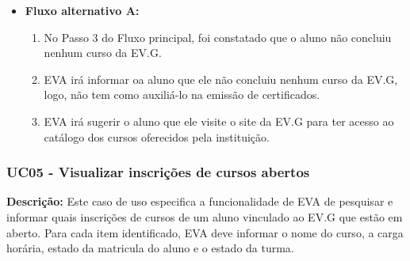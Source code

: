 \begin{itemize}
\begin{enumerate}
        \end{enumerate}
    \item \textbf{Fluxo alternativo A:}
        \begin{enumerate}
            \item No Passo 3 do Fluxo principal, foi constatado que o aluno não concluiu nenhum curso da EV.G.
            \item EVA irá informar oa aluno que ele não concluiu nenhum curso da EV.G, logo, não tem como auxiliá-lo na emissão de certificados.
            \item EVA irá sugerir o aluno que ele visite o site da EV.G para ter acesso ao catálogo dos cursos oferecidos pela instituição.
        \end{enumerate}
\end{itemize}


\subsubsection{UC05 - Visualizar inscrições de cursos abertos}
\textbf{Descrição:} Este caso de uso especifica a funcionalidade de EVA de pesquisar e informar quais inscrições de cursos de um aluno vinculado ao EV.G que estão em aberto. Para cada item identificado, EVA deve informar o nome do curso, a carga horária, estado da matricula do aluno e o estado da turma. 

